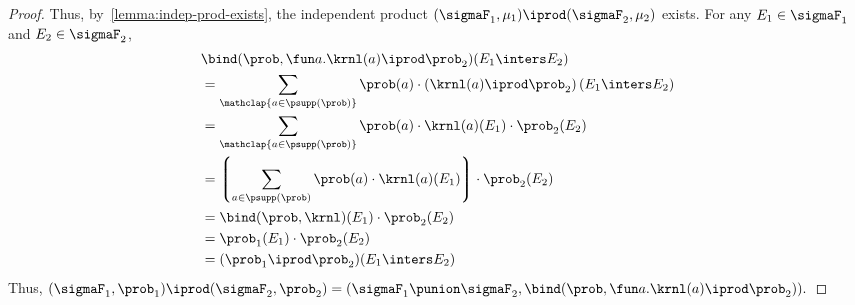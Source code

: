 \begin{proof}
   Thus, by~\cref{lemma:indep-prod-exists},
   the independent product $(\sigmaF_1, \mu_1) \iprod (\sigmaF_2, \mu_2)$ exists.
For any $E_1 \in \sigmaF_1$ and $E_2 \in \sigmaF_2$,
\begin{align*}
   &\bind(\prob, \fun a. \krnl(a) \iprod \prob_2 ) (E_1 \inters E_2)\\
  &= \sum_{\mathclap{a \in \psupp(\prob)}}
     \prob(a) \cdot
     \left(\krnl(a) \iprod  \prob_2\right)(E_1 \inters E_2) \\
  &= \sum_{\mathclap{a \in \psupp(\prob)}}
      \prob(a) \cdot \krnl(a)(E_1) \cdot \prob_2(E_2) \\
  &= \left\lgroup
     \sum_{a \in \psupp(\prob)}
      \prob(a) \cdot \krnl(a)(E_1)
    \right\rgroup \cdot \prob_2(E_2) \\
  &= \bind(\prob, \krnl)(E_1) \cdot \prob_2(E_2) \\
  &= \prob_1(E_1) \cdot \prob_2(E_2) \\
  &= (\prob_1 \iprod \prob_2)(E_1 \inters E_2)
  \end{align*}
Thus,
  $
   (\sigmaF_1, \prob_1) \iprod (\sigmaF_2, \prob_2)
  = (\sigmaF_1 \punion \sigmaF_2,
     \bind(\prob, \fun a. \krnl(a) \iprod \prob_2)).
  $
 \end{proof}

